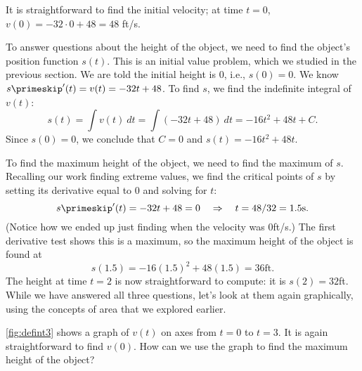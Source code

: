 {It is straightforward to find the initial velocity; at time $t=0$, $v(0) =-32\cdot 0+48 = 48 $ ft/s.

To answer questions about the height of the object, we need to find the object's position function $s(t)$. This is an initial value problem, which we studied in the previous section. We are told the initial height is 0, i.e., $s(0) = 0$. We know $s\primeskip'(t) = v(t) = -32t+48$. To find $s$, we find the indefinite integral of $v(t)$:
\[s(t)=\int v(t)\ dt = \int (-32t+48)\ dt = -16t^2+48t+C.\]
Since $s(0) = 0$, we conclude that $C=0$ and $s(t) = -16t^2+48t$.

To find the maximum height of the object, we need to find the maximum of $s$. Recalling our work finding extreme values, we find the critical points of $s$ by setting its derivative equal to 0 and solving for $t$:
		\[s\primeskip'(t) = -32t+48 = 0 \quad \Rightarrow \quad t=48/32 = 1.5\text{s}.\]
(Notice how we ended up just finding when the velocity was 0ft/s.) The first derivative test shows this is a maximum, so the maximum height of the object is found at
\[s(1.5) = -16(1.5)^2+48(1.5)=36\text{ft}.\]
The height at time $t=2$ is now straightforward to compute: it is $s(2) = 32$ft.\\

While we have answered all three questions, let's look at them again graphically, using the concepts of area that we explored earlier.


\autoref{fig:defint3} shows a graph of $v(t)$ on axes from $t=0$ to $t=3$. It is again straightforward to find $v(0)$. How can we use the graph to find the maximum height of the object?


}
